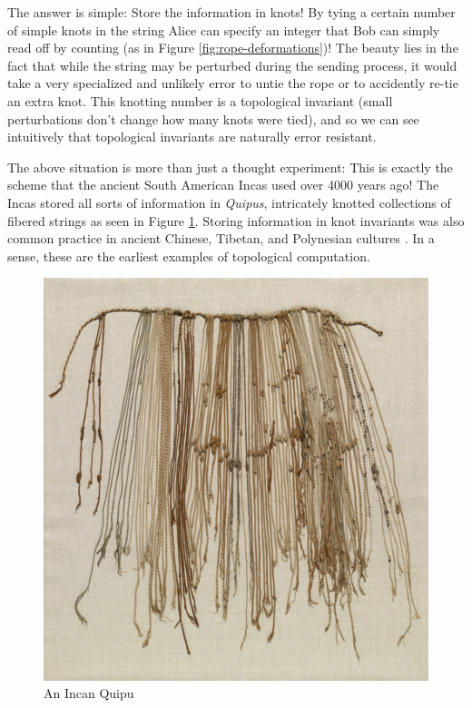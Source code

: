 \documentclass{article}
\theoremstyle{definition}
\numberwithin{figure}{section}
\begin{document}
The answer is simple: Store the information in knots! By tying a certain number of simple knots in the string Alice can specify an integer that Bob can simply read off by counting (as in Figure \ref{fig:rope-deformations})! The beauty lies in the fact that while the string may be perturbed during the sending process, it would take a very specialized and unlikely error to untie the rope or to accidently re-tie an extra knot. This knotting number is a topological invariant (small perturbations don't change how many knots were tied), and so we can see intuitively that topological invariants are naturally error resistant.

The above situation is more than just a thought experiment: This is exactly the scheme that the ancient South American Incas used over 4000 years ago! The Incas stored all sorts of information in \textit{Quipus}, intricately knotted collections of fibered strings \cite{ascher1981code} as seen in Figure \ref{fig:quipu}. Storing information in knot invariants was also common practice in ancient Chinese, Tibetan, and Polynesian cultures \cite{day2021quipus}. In a sense, these are the earliest examples of topological computation.

\begin{figure}
\begin{center}
\includegraphics[scale=0.85]{quipu}
\caption{An Incan Quipu}
\label{fig:quipu}
\end{center}
\end{figure}
\end{document}
